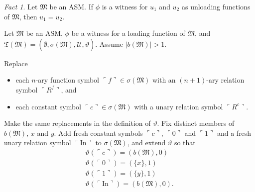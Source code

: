 \documentclass[12pt, twoside]{memoir}
\numberwithin{equation}{section}
\theoremstyle{definition}
\theoremstyle{remark}
\newtheorem{fact}[thm]{Fact}
\theoremstyle{definition}
\theoremstyle{definition}
\theoremstyle{definition}
\theoremstyle{remark}
\begin{document}
\begin{fact}\label{fact216}
Let $\mathfrak{M}$ be an ASM. If $\phi$ is a witness for $u_1$ and $u_2$ as unloading functions of $\mathfrak{M}$, then $u_1 = u_2$.
\end{fact}

Let $\mathfrak{M}$ be an ASM, $\phi$ be a witness for a loading function of $\mathfrak{M}$, and $\mathfrak{T}(\mathfrak{M}) = (\emptyset, \sigma(\mathfrak{M}), \dot{\mathcal{U}}, \vartheta)$. Assume $|b(\mathfrak{M})| > 1$. 

Replace
\begin{itemize}
    \item each $n$-ary function symbol $\ulcorner f \urcorner \in \sigma(\mathfrak{M})$ with an $(n+1)$-ary relation symbol $\ulcorner R^f \urcorner$, and
    \item each constant symbol $\ulcorner c \urcorner \in \sigma(\mathfrak{M})$ with a unary relation symbol $\ulcorner R^c \urcorner$.
\end{itemize}
Make the same replacements in the definition of $\vartheta$. Fix distinct members of $b(\mathfrak{M})$, $x$ and $y$. Add fresh constant symbols $\ulcorner c \urcorner$, $\ulcorner 0 \urcorner$ and $\ulcorner 1 \urcorner$ and a fresh unary relation symbol $\ulcorner \mathrm{In} \urcorner$ to $\sigma(\mathfrak{M})$, and extend $\vartheta$ so that
\begin{gather*}
    \vartheta(\ulcorner c \urcorner) = (b(\mathfrak{M}), 0) \\
    \vartheta(\ulcorner 0 \urcorner) = (\{x\}, 1) \\
    \vartheta(\ulcorner 1 \urcorner) = (\{y\}, 1) \\
    \vartheta(\ulcorner \mathrm{In} \urcorner) = (b(\mathfrak{M}), 0) \text{.}
\end{gather*}
\end{document}
